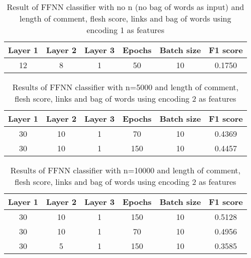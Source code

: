 \begin{table}[!htbp]
\centering
\caption{Result of FFNN classifier with no n (no bag of words as input) and length of comment, flesh score, links and bag of words using encoding 1 as features}
\label{f3}
\begin{tabular}{c|c|c|c|c|c}
\textbf{Layer 1} & \textbf{Layer 2} & \textbf{Layer 3} &  \textbf{Epochs} & \textbf{Batch size} & F1 score\\\hline
12 &8& 1& 50& 10 & 0.1750
\end{tabular}
\end{table}

\begin{table}[!htbp]
\centering
\caption{Results of FFNN classifier with n=5000 and length of comment, flesh score, links and bag of words using encoding 2 as features}
\label{f4}
\begin{tabular}{c|c|c|c|c|c}
\textbf{Layer 1} & \textbf{Layer 2} & \textbf{Layer 3} &  \textbf{Epochs} & \textbf{Batch size} & F1 score\\\hline
30&10&1&70&10 & 0.4369\\\hline
30&10&1&150&10 & 0.4457
\end{tabular}
\end{table}

\begin{table}[!htbp]
\centering
\caption{Results of FFNN classifier with n=10000 and length of comment, flesh score, links and bag of words using encoding 2 as features}
\label{f5}
\begin{tabular}{c|c|c|c|c|c}
\textbf{Layer 1} & \textbf{Layer 2} & \textbf{Layer 3} &  \textbf{Epochs} & \textbf{Batch size} & F1 score\\\hline
30&10&1&150&10 & 0.5128\\\hline
30&10&1&70&10 & 0.4956\\\hline
30&5&1&150&10 & 0.3585
\end{tabular}
\end{table}